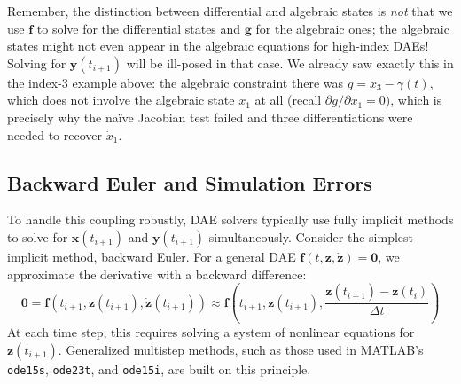 Remember, the distinction between differential and algebraic states is \emph{not} that we use $\mathbf{f}$ to solve for the differential states and $\mathbf{g}$ for the algebraic ones; the algebraic states might not even appear in the algebraic equations for high-index DAEs! Solving for $\mathbf{y}(t_{i+1})$ will be ill-posed in that case. We already saw exactly this in the index-3 example above: the algebraic constraint there was $g = x_3 - \gamma(t)$, which does not involve the algebraic state $x_1$ at all (recall $\partial g/\partial x_1 = 0$), which is precisely why the na\"ive Jacobian test failed and three differentiations were needed to recover $\dot x_1$.



\subsection{Backward Euler and Simulation Errors}

To handle this coupling robustly, DAE solvers typically use fully implicit methods to solve for $\mathbf{x}(t_{i+1})$ and $\mathbf{y}(t_{i+1})$ simultaneously. Consider the simplest implicit method, backward Euler. For a general DAE $\mathbf{f}(t, \mathbf{z}, \dot{\mathbf{z}}) = \mathbf{0}$, we approximate the derivative with a backward difference:
\begin{equation}
    \mathbf{0} = \mathbf{f} \left( t_{i+1}, \mathbf{z}(t_{i+1}), \mathbf{\dot z}(t_{i+1}) \right)  \approx \mathbf{f}\left( t_{i+1}, \mathbf{z}(t_{i+1}), \frac{\mathbf{z}(t_{i+1}) - \mathbf{z}(t_i)}{\Delta t} \right)
\end{equation}
At each time step, this requires solving a system of nonlinear equations for $\mathbf{z}(t_{i+1})$. Generalized multistep methods, such as those used in MATLAB's \texttt{ode15s}, \texttt{ode23t}, and \texttt{ode15i}, are built on this principle.

